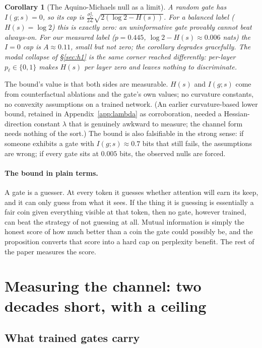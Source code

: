 \documentclass[11pt,a4paper]{article}
\newtheorem{corollary}{Corollary}
\newcommand{\LL}{\mathcal{L}}
\begin{document}
\begin{corollary}[The Aquino-Michaels null as a limit]
\label{cor:am}
A random gate has $I(g;s) = 0$, so its cap is
$\frac{\sigma_C^2}{2\LL}\sqrt{2(\log 2 - H(s))}$. For a balanced label
($H(s) = \log 2$) this is exactly zero: an uninformative gate provably
cannot beat always-on. For our measured label ($p = 0.445$,
$\log 2 - H(s) \approx 0.006$ nats) the $I{=}0$ cap is $A \approx 0.11$,
small but not zero; the corollary degrades gracefully. The modal collapse
of \S\ref{sec:h1} is the same corner reached differently: per-layer
$p_\ell \in \{0,1\}$ makes $H(s)$ per layer zero and leaves nothing to
discriminate.
\end{corollary}

The bound's value is that both sides are measurable. $H(s)$ and $I(g;s)$
come from counterfactual ablations and the gate's own values; no
curvature constants, no convexity assumptions on a trained network. (An
earlier curvature-based lower bound, retained in
Appendix~\ref{app:lambda} as corroboration, needed a Hessian-direction
constant $\lambda$ that is genuinely awkward to measure; the channel form
needs nothing of the sort.) The bound is also falsifiable in the strong
sense: if someone exhibits a gate with $I(g;s) \approx 0.7$ bits that
still fails, the assumptions are wrong; if every gate sits at $0.005$
bits, the observed nulls are forced.

\paragraph{The bound in plain terms.} A gate is a guesser. At every token
it guesses whether attention will earn its keep, and it can only guess
from what it sees. If the thing it is guessing is essentially a fair coin
given everything visible at that token, then no gate, however trained,
can beat the strategy of not guessing at all. Mutual information is
simply the honest score of how much better than a coin the gate could
possibly be, and the proposition converts that score into a hard cap on
perplexity benefit. The rest of the paper measures the score.

\section{Measuring the channel: two decades short, with a ceiling}
\label{sec:ceiling}

\subsection{What trained gates carry}
\label{sec:mi}
\end{document}
